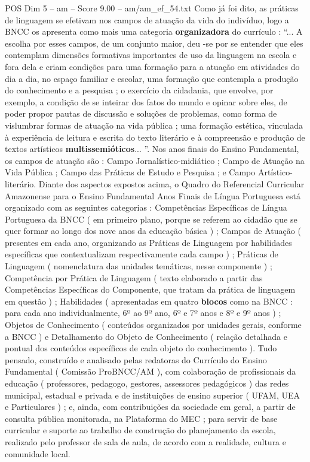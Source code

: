 \begin{textsample}{POS Dim 5 – am – Score 9.00 – am/am\_ef\_54.txt}
Como já foi dito, as práticas de linguagem se efetivam nos campos de atuação da vida do indivíduo, logo a BNCC os apresenta como mais uma categoria \textbf{organizadora} do currículo : “...
A escolha por esses campos, de um conjunto maior, deu -se por se entender que eles contemplam dimensões formativas importantes de uso da linguagem na escola e fora dela e criam condições para uma formação para a atuação em atividades do dia a dia, no espaço familiar e escolar, uma formação que contempla a produção do conhecimento e a pesquisa ; o exercício da cidadania, que envolve, por exemplo, a condição de se inteirar dos fatos do mundo e opinar sobre eles, de poder propor pautas de discussão e soluções de problemas, como forma de vislumbrar formas de atuação na vida pública ; uma formação estética, vinculada à experiência de leitura e escrita do texto literário e à compreensão e produção de textos artísticos \textbf{multissemióticos}... ”.
Nos anos finais do Ensino Fundamental, os campos de atuação são : Campo Jornalístico-midiático ; Campo de Atuação na Vida Pública ; Campo das Práticas de Estudo e Pesquisa ; e Campo Artístico-literário.
Diante dos aspectos expostos acima, o Quadro do Referencial Curricular Amazonense para o Ensino Fundamental Anos Finais de Língua Portuguesa está organizado com as seguintes categorias : Competências Específicas de Língua Portuguesa da BNCC ( em primeiro plano, porque se referem ao cidadão que se quer formar ao longo dos nove anos da educação básica ) ; Campos de Atuação ( presentes em cada ano, organizando as Práticas de Linguagem por habilidades específicas que contextualizam respectivamente cada campo ) ; Práticas de Linguagem ( nomenclatura das unidades temáticas, nesse componente ) ; Competência por Prática de Linguagem ( texto elaborado a partir das Competências Específicas do Componente, que tratam da prática de linguagem em questão ) ; Habilidades ( apresentadas em quatro \textbf{blocos} como na BNCC : para cada ano individualmente, 6º ao 9º ano, 6º e 7º anos e 8º e 9º anos ) ; Objetos de Conhecimento ( conteúdos organizados por unidades gerais, conforme a BNCC ) e Detalhamento do Objeto de Conhecimento ( relação detalhada e pontual dos conteúdos específicos de cada objeto do conhecimento ).
Tudo pensado, construído e analisado pelas redatoras do Currículo do Ensino Fundamental ( Comissão ProBNCC/AM ), com colaboração de profissionais da educação ( professores, pedagogo, gestores, assessores pedagógicos ) das redes municipal, estadual e privada e de instituições de ensino superior ( UFAM, UEA e Particulares ) ; e, ainda, com contribuições da sociedade em geral, a partir de consulta pública monitorada, na Plataforma do MEC ; para servir de base curricular e suporte ao trabalho de construção do planejamento da escola, realizado pelo professor de sala de aula, de acordo com a realidade, cultura e comunidade local.

\end{textsample}
